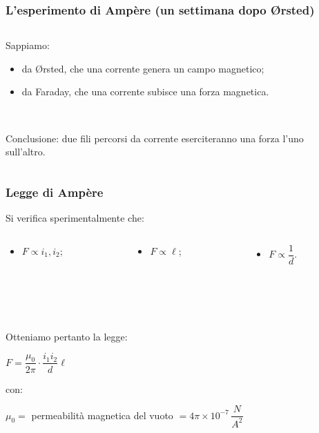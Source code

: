 \documentclass[]{beamer}
\theoremstyle{plain}
\begin{document}
\begin{frame}
\frametitle{L'esperimento di Ampère (un settimana dopo \O rsted)}
\begin{columns}
\begin{column}{0.4\textwidth}
Sappiamo:
\begin{itemize}
  \item da \O rsted, che \alert<1>{una corrente genera un campo magnetico};\pause
  \item da Faraday, che \alert<2>{una corrente subisce una forza magnetica}.\pause
\end{itemize}

~

Conclusione: \alert<3>{due fili percorsi da corrente eserciteranno una forza l'uno sull'altro}.
\end{column}
\begin{column}{0.5\textwidth}
\end{column}
\end{columns}
\end{frame}

\begin{frame}
\frametitle{Legge di Ampère}
Si verifica sperimentalmente che:
\begin{columns}
\begin{column}{0.3\textwidth}
\begin{itemize}
  \item $ F \propto i_1, i_2 $;
\end{itemize}
\end{column}
\begin{column}{0.3\textwidth}
\begin{itemize}
  \item $ F \propto \ell $;
\end{itemize}
\end{column}
\begin{column}{0.3\textwidth}
\begin{itemize}
  \item $ F \propto \dfrac{1}{d} $.
\end{itemize}
\end{column}
\end{columns}\pause

~

~

Otteniamo pertanto la legge:
\begin{center}
\colorbox{blue!30}{$ F = \dfrac{\mu_0}{2\pi} \cdot \dfrac{i_1i_2}{d}\ell $}
\end{center}
con:
\begin{center}
\colorbox{blue!30}{$ \mu_0 = $ permeabilità magnetica del vuoto $ = 4\pi \times 10^{-7} \, \dfrac{N}{A^2} $}
\end{center}
\end{frame}
\end{document}

